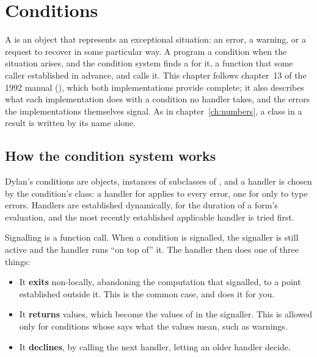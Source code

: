 \chapter{Conditions}\label{ch:conditions}

A  is an object that represents an exceptional
situation: an error, a warning, or a request to recover in some
particular way. A program  a condition when the situation
arises, and the condition system finds a  for it, a
function that some caller established in advance, and calls it. This
chapter follows chapter~13 of the 1992 manual (),
which both implementations provide complete; it also describes what each
implementation does with a condition no handler takes, and the errors
the implementations themselves signal. As in chapter~\ref{ch:numbers}, a
class in a result is written by its name alone.

\section{How the condition system works}\label{sec:conditions-overview}

Dylan's conditions are objects, instances of subclasses of
, and a handler is chosen by the condition's class: a
handler for  applies to every error, one for
 only to type errors. Handlers are established
dynamically, for the duration of a form's evaluation, and the most
recently established applicable handler is tried first.

Signalling is a function call. When a condition is signalled, the
signaller is still active and the handler runs ``on top of'' it. The
handler then does one of three things:

\begin{itemize}
\item It \textbf{exits} non-locally, abandoning the computation that
  signalled, to a point established outside it. This is the common case,
  and  does it for you.
\item It \textbf{returns} values, which become the values of
   in the signaller. This is allowed only for conditions
  whose  says what the values mean, such as
  warnings.
\item It \textbf{declines}, by calling the next handler, letting an
  older handler decide.
\end{itemize}

